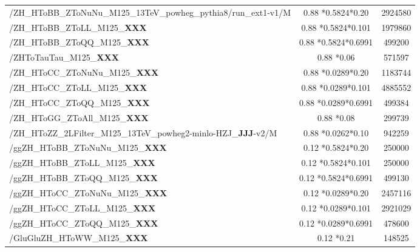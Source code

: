 \begin{table}
\begin{adjustbox}{max width=\textwidth}
\begin{tabular}{lcc}
 /ZH\_HToBB\_ZToNuNu\_M125\_13TeV\_powheg\_pythia8/run\_ext1-v1/M                         & 0.88  *0.5824*0.20                     &2924580   \\
 /ZH\_HToBB\_ZToLL\_M125\_{\bf{XXX}}                                 & 0.88  *0.5824*0.101                    &1979860   \\
 /ZH\_HToBB\_ZToQQ\_M125\_{\bf{XXX}}                                 & 0.88  *0.5824*0.6991                   &499200    \\
 /ZHToTauTau\_M125\_{\bf{XXX}}                                       & 0.88  *0.06                            &571597    \\
 /ZH\_HToCC\_ZToNuNu\_M125\_{\bf{XXX}}                               & 0.88  *0.0289*0.20                     &1183744   \\
 /ZH\_HToCC\_ZToLL\_M125\_{\bf{XXX}}                                 & 0.88  *0.0289*0.101                    &4885552   \\
 /ZH\_HToCC\_ZToQQ\_M125\_{\bf{XXX}}                                 & 0.88  *0.0289*0.6991                   &499384    \\
 /ZH\_HToGG\_ZToAll\_M125\_{\bf{XXX}}                                & 0.88  *0.08                            &299739    \\
 /ZH\_HToZZ\_2LFilter\_M125\_13TeV\_powheg2-minlo-HZJ\_{\bf{JJJ}}-v2/M    & 0.88  *0.0262*0.10                     &942259    \\\hline
                                                                                                                                                   
 /ggZH\_HToBB\_ZToNuNu\_M125\_{\bf{XXX}}                             & 0.12  *0.5824*0.20                     &250000    \\
 /ggZH\_HToBB\_ZToLL\_M125\_{\bf{XXX}}                               & 0.12  *0.5824*0.101                    &250000    \\
 /ggZH\_HToBB\_ZToQQ\_M125\_{\bf{XXX}}                               & 0.12  *0.5824*0.6991                   &499130    \\
 /ggZH\_HToCC\_ZToNuNu\_M125\_{\bf{XXX}}                             & 0.12  *0.0289*0.20                     &2457116   \\
 /ggZH\_HToCC\_ZToLL\_M125\_{\bf{XXX}}                               & 0.12  *0.0289*0.101                    &2921029   \\
 /ggZH\_HToCC\_ZToQQ\_M125\_{\bf{XXX}}                               & 0.12  *0.0289*0.6991                   &478600    \\
 /GluGluZH\_HToWW\_M125\_{\bf{XXX}}                                  & 0.12  *0.21                            &148525    \\\hline
                                                                                                                                                   

\end{tabular}
\end{adjustbox}
\end{table}
